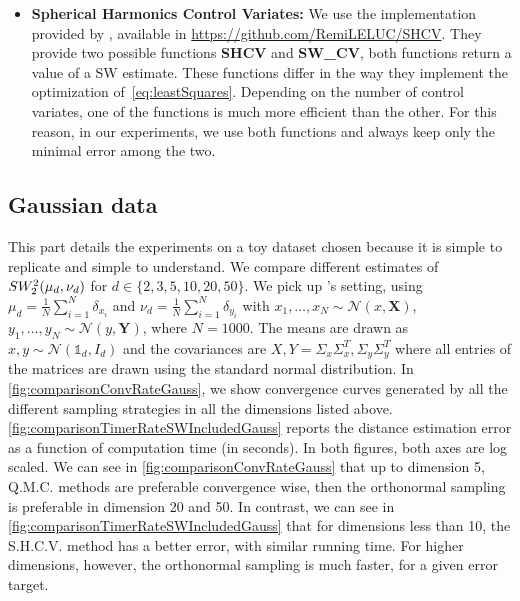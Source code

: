 \begin{itemize}
\item \textbf{Spherical Harmonics Control Variates: }We use the implementation provided by \citet{leluc2024slicedwassersteinestimationsphericalharmonics}, available in \url{https://github.com/RemiLELUC/SHCV}. {They provide two possible functions}  \textbf{SHCV} and \textbf{SW\_CV}, both functions return a value of a SW estimate. {These functions differ in the way they implement the optimization of~\autoref{eq:leastSquares}. Depending on the number of control variates, one of the functions is much more efficient than the other. For this reason, in our experiments, we use both functions and always keep only the minimal error among the two.} 

\end{itemize}

\subsection{Gaussian data} \label{sec:GaussExp}

{This part details the experiments on a toy dataset chosen because it is simple to replicate and simple to understand.}
{We} compare different estimates of $SW_2^2(\mu_d, \nu_d)$ for $d\in \lbrace 
2,3,5,10,20,50\rbrace$. We pick up 
\citet{leluc2024slicedwassersteinestimationsphericalharmonics}'s setting, using 
$\mu_d = \frac{1}{N}\sum\limits_{i=1}^{N} \delta_{x_i}$ and $\nu_d = 
\frac{1}{N}\sum\limits_{i=1}^{N} \delta_{y_i}$ with $x_1,\hdots,x_N\sim 
\mathcal{N}(x, \textbf{X})$, $y_1,\hdots,y_N \sim \mathcal{N}(y, \textbf{Y})$, 
where $N = 1000$. The means are {drawn as} $x,y\sim \mathcal{N}(\mathbb{1}_d, 
I_d)$ and the covariances are $X,Y= \Sigma_x\Sigma_x^T, \Sigma_y\Sigma_y^T$ 
where all entries of the matrices are drawn {using} the standard normal 
distribution. In \autoref{fig:comparisonConvRateGauss}, we show  
convergence curves generated by all the different sampling strategies 
{in all the}
dimensions listed above. 
{\autoref{fig:comparisonTimerRateSWIncludedGauss} reports the 
distance estimation error as a function of computation time (in seconds).}
In 
both figures, both axes are log scaled. We can see in 
\autoref{fig:comparisonConvRateGauss} that up to dimension 5, Q.M.C. methods are 
preferable convergence wise, then the orthonormal sampling is preferable in 
dimension 20 and 50. 
{In contrast,}
we can see in \autoref{fig:comparisonTimerRateSWIncludedGauss} that for 
{dimensions} less than 10,  
{the S.H.C.V. method has a better error,}
with 
similar running time. 
{For}
higher 
{dimensions}, 
{however,}
the orthonormal sampling is 
{much faster,}
{for a given error target.}

